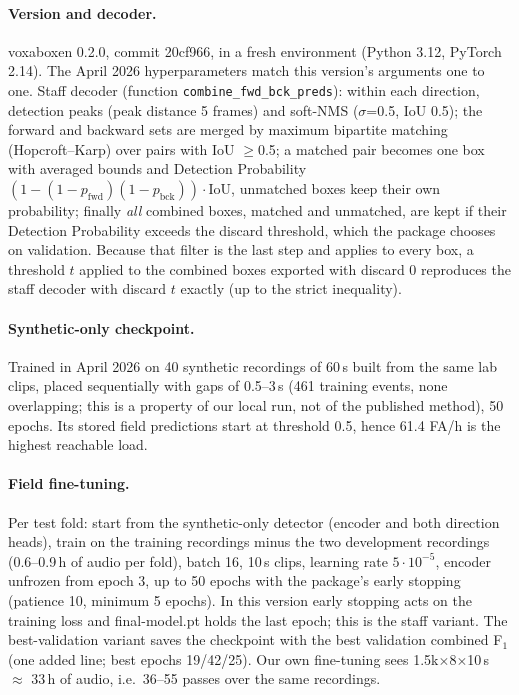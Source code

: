 \documentclass[10pt,twocolumn]{article}
\newcommand{\Fone}{F$_1$}
\begin{document}
\paragraph{Version and decoder.} voxaboxen 0.2.0, commit 20cf966, in a fresh environment (Python 3.12, PyTorch 2.14). The April 2026 hyperparameters match this version's arguments one to one. Staff decoder (function \texttt{combine\_fwd\_bck\_preds}): within each direction, detection peaks (peak distance 5 frames) and soft-NMS ($\sigma$=0.5, IoU 0.5); the forward and backward sets are merged by maximum bipartite matching (Hopcroft--Karp) over pairs with IoU $\ge$0.5; a matched pair becomes one box with averaged bounds and Detection Probability $(1-(1-p_{\mathrm{fwd}})(1-p_{\mathrm{bck}}))\cdot\mathrm{IoU}$, unmatched boxes keep their own probability; finally \emph{all} combined boxes, matched and unmatched, are kept if their Detection Probability exceeds the discard threshold, which the package chooses on validation. Because that filter is the last step and applies to every box, a threshold $t$ applied to the combined boxes exported with discard 0 reproduces the staff decoder with discard $t$ exactly (up to the strict inequality).
\paragraph{Synthetic-only checkpoint.} Trained in April 2026 on 40 synthetic recordings of 60\,s built from the same lab clips, placed sequentially with gaps of 0.5--3\,s (461 training events, none overlapping; this is a property of our local run, not of the published method), 50 epochs. Its stored field predictions start at threshold 0.5, hence 61.4 FA/h is the highest reachable load.
\paragraph{Field fine-tuning.} Per test fold: start from the synthetic-only detector (encoder and both direction heads), train on the training recordings minus the two development recordings (0.6--0.9\,h of audio per fold), batch 16, 10\,s clips, learning rate $5\cdot10^{-5}$, encoder unfrozen from epoch 3, up to 50 epochs with the package's early stopping (patience 10, minimum 5 epochs). In this version early stopping acts on the training loss and final-model.pt holds the last epoch; this is the staff variant. The best-validation variant saves the checkpoint with the best validation combined \Fone{} (one added line; best epochs 19/42/25). Our own fine-tuning sees 1.5k$\times$8$\times$10\,s $\approx$ 33\,h of audio, i.e.\ 36--55 passes over the same recordings.
\end{document}
